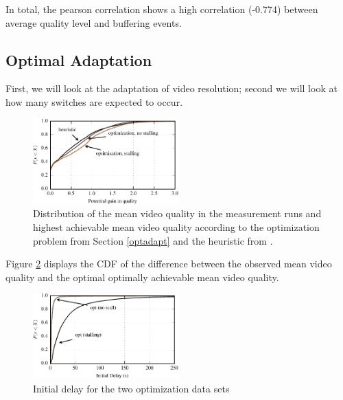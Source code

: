 In total, the pearson correlation shows a high correlation (-0.774) between average quality level and buffering events.

\subsection{Optimal Adaptation}

First, we will look at the adaptation of video resolution; second we will look at how many switches are expected to occur.

\begin{figure}[t]
\centering
\includegraphics[width=0.5\textwidth]{figs/qualitygain_py}%
\caption{Distribution of the mean video quality in the measurement runs and highest achievable mean video quality according to the optimization problem from Section \ref{optadapt} and the heuristic from \cite{sieber16sacrificing}.}
\label{fig:opt}%
\end{figure}

Figure \ref{fig:opt} displays the CDF of the difference between the observed mean video quality and the optimal optimally achievable mean video quality.

\begin{figure}[t]
\centering
\includegraphics[width=0.5\textwidth]{figs/initial_delay_py}%
\caption{Initial delay for the two optimization data sets}
\label{fig:opt}%
\end{figure}


